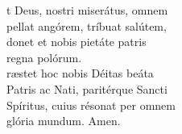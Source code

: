 \vspace{0.3cm}


\vspace{0.15cm}

\def\greinitialformat#1{{\fontsize{40}{40}\selectfont #1}}

\vspace{0.3cm}
\begin{centering}


t Deus, nostri miserátus, omnem\\
pellat angórem, tríbuat salútem, \\
donet et nobis pietáte patris\\
	regna polórum.\\
	
	
ræstet hoc nobis Déitas beáta\\
Patris ac Nati, paritérque Sancti\\
Spíritus, cuius résonat per omnem\\
	glória mundum. Amen.


\end{centering}

\newpage